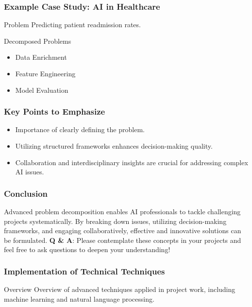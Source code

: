 \documentclass[aspectratio=169]{beamer}
\begin{document}
\begin{frame}[fragile]
    \frametitle{Example Case Study: AI in Healthcare}
    \begin{block}{Problem}
        Predicting patient readmission rates.
    \end{block}
    \begin{block}{Decomposed Problems}
        \begin{itemize}
            \item Data Enrichment
            \item Feature Engineering
            \item Model Evaluation
        \end{itemize}
    \end{block}
\end{frame}

\begin{frame}[fragile]
    \frametitle{Key Points to Emphasize}
    \begin{itemize}
        \item Importance of clearly defining the problem.
        \item Utilizing structured frameworks enhances decision-making quality.
        \item Collaboration and interdisciplinary insights are crucial for addressing complex AI issues.
    \end{itemize}
\end{frame}

\begin{frame}[fragile]
    \frametitle{Conclusion}
    Advanced problem decomposition enables AI professionals to tackle challenging projects systematically. By breaking down issues, utilizing decision-making frameworks, and engaging collaboratively, effective and innovative solutions can be formulated.    
    \newline
    \textbf{Q \& A}: Please contemplate these concepts in your projects and feel free to ask questions to deepen your understanding!
\end{frame}

\begin{frame}
    \frametitle{Implementation of Technical Techniques}
    \begin{block}{Overview}
        Overview of advanced techniques applied in project work, including machine learning and natural language processing.
    \end{block}
\end{frame}
\end{document}
